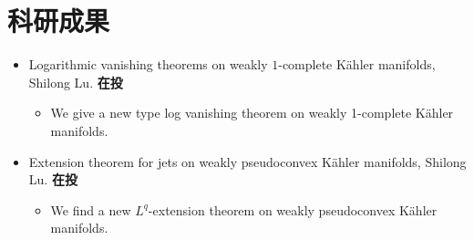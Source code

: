 \documentclass[zihao=-4,a4paper,fontset=none]{ctexart}
\newlength{\iconwidth}
\begin{document}
    \begin{minipage}[t]{\textwidth}
    \section[科研成果]{\makebox[\iconwidth][c]{\color{main}{\faAtom}}\hspace{1em} 科研成果}

    \begin{itemize}
        \item     Logarithmic vanishing theorems on weakly $1$-complete K\"ahler manifolds, Shilong Lu. \hfill \textbf{在投} 
        \begin{itemize}[]
            \item We give a new type log vanishing theorem on weakly 1-complete K\"ahler manifolds.
        \end{itemize}
    \end{itemize}

    \vspace{0.5em}

    \begin{itemize}
        \item     Extension theorem for jets on weakly pseudoconvex K\"ahler manifolds, Shilong Lu. \hfill \textbf{在投} 
        \begin{itemize}[]
            \item We find a new $L^q$-extension theorem on weakly pseudoconvex K\"ahler manifolds.
        \end{itemize}
    \end{itemize}
    
    \vspace{1.2em}
    \end{minipage}

    
\end{document}
